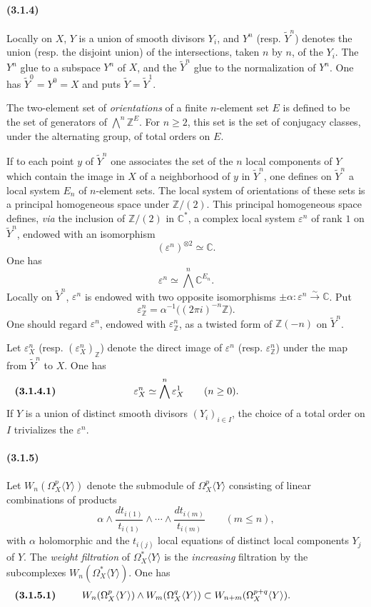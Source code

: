 \documentclass[10pt]{article}
\newcommand{\C}{\mathbb C}
\newcommand{\Z}{\mathbb Z}
\newcommand{\iso}{\xrightarrow{\sim}}
\begin{document}
\paragraph{(3.1.4)} Locally on $X$, $Y$ is a union of smooth divisors $Y_i$, and $Y^n$ (resp. $\widetilde Y^n$) denotes the union (resp. the disjoint union) of the intersections, taken $n$ by $n$, of the $Y_i$. The $Y^n$ glue to a subspace $Y^n$ of $X$, and the $\widetilde Y^n$ glue to the normalization of $Y^n$. One has $\widetilde Y^0=Y^0=X$ and puts $\widetilde Y=\widetilde Y^1$.

The two-element set of \emph{orientations} of a finite $n$-element set $E$ is defined to be the set of generators of $\bigwedge^n\Z^E$. For $n\ge2$, this set is the set of conjugacy classes, under the alternating group, of total orders on $E$.

If to each point $y$ of $\widetilde Y^n$ one associates the set of the $n$ local components of $Y$ which contain the image in $X$ of a neighborhood of $y$ in $\widetilde Y^n$, one defines on $\widetilde Y^n$ a local system $E_n$ of $n$-element sets. The local system of orientations of these sets is a principal homogeneous space under $\Z/(2)$. This principal homogeneous space defines, \emph{via} the inclusion of $\Z/(2)$ in $\C^*$, a complex local system $\varepsilon^n$ of rank $1$ on $\widetilde Y^n$, endowed with an isomorphism
\[
(\varepsilon^n)^{\otimes2}\simeq\C.
\]
One has
\[
\varepsilon^n\simeq\bigwedge^n\C^{E_n}.
\]
Locally on $\widetilde Y^n$, $\varepsilon^n$ is endowed with two opposite isomorphisms $\pm\alpha:\varepsilon^n\iso\C$. Put
\[
\varepsilon_\Z^n=\alpha^{-1}\bigl((2\pi i)^{-n}\Z\bigr).
\]
One should regard $\varepsilon^n$, endowed with $\varepsilon_\Z^n$, as a twisted form of $\Z(-n)$ on $\widetilde Y^n$.

Let $\varepsilon_X^n$ (resp. $(\varepsilon_X^n)_\Z$) denote the direct image of $\varepsilon^n$ (resp. $\varepsilon_\Z^n$) under the map from $\widetilde Y^n$ to $X$. One has
\[
\makebox[\textwidth][s]{\textbf{(3.1.4.1)}\hfill$\displaystyle \varepsilon_X^n\simeq\bigwedge^n\varepsilon_X^1\qquad(n\ge0).$\hfill\phantom{\textbf{(3.1.4.1)}}}
\]
If $Y$ is a union of distinct smooth divisors $(Y_i)_{i\in I}$, the choice of a total order on $I$ trivializes the $\varepsilon^n$.

\paragraph{(3.1.5)} Let $W_n(\Omega_X^p\langle Y\rangle)$ denote the submodule of $\Omega_X^p\langle Y\rangle$ consisting of linear combinations of products
\[
\alpha\wedge\frac{dt_{i(1)}}{t_{i(1)}}\wedge\cdots\wedge
\frac{dt_{i(m)}}{t_{i(m)}}\qquad(m\le n),
\]
with $\alpha$ holomorphic and the $t_{i(j)}$ local equations of distinct local components $Y_j$ of $Y$. The \emph{weight filtration} of $\Omega_X^*\langle Y\rangle$ is the \emph{increasing} filtration by the subcomplexes $W_n(\Omega_X^*\langle Y\rangle)$. One has
\[
\makebox[\textwidth][s]{\textbf{(3.1.5.1)}\hfill$\displaystyle W_n(\Omega_X^p\langle Y\rangle)\wedge W_m(\Omega_X^q\langle Y\rangle)\subset W_{n+m}(\Omega_X^{p+q}\langle Y\rangle).$\hfill\phantom{\textbf{(3.1.5.1)}}}
\]
\end{document}
